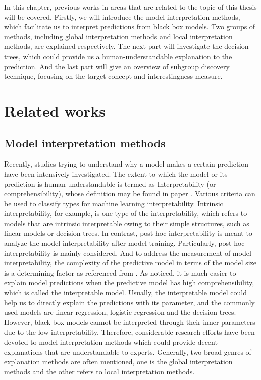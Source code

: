 In this chapter, previous works in areas that are related to the topic of this thesis will be covered. Firstly, we will introduce the model interpretation methods, which facilitate us to interpret predictions from black box models. Two groups of methods, including global interpretation methods and local interpretation methods, are explained respectively. The next part will investigate the decision trees, which could provide us a human-understandable explanation to the prediction. And the last part will give an overview of subgroup discovery technique, focusing on the target concept and interestingness measure. 

\section{Related works}

\subsection{Model interpretation methods}
Recently, studies trying to understand why a model makes a certain prediction have been intensively investigated. The extent to which the model or its prediction is human-understandable is termed as Interpretability (or comprehensibility), whose definition may be found in paper \cite{kim2016examples}. Various criteria can be used to classify types for machine learning interpretability. Intrinsic interpretability, for example, is one type of the interpretability, which refers to models that are intrinsic interpretable owing to their simple structures, such as linear models or decision trees. In contrast, post hoc interpretability is meant to analyze the model interpretability after model training. Particularly, post hoc interpretability is mainly considered. And to address the measurement of model interpretability, the complexity of the predictive model in terms of the model size is a determining factor as referenced from \cite{freitas2014comprehensible}. As noticed, it is much easier to explain model predictions when the predictive model has high comprehensibility, which is called the interpretable model. Usually, the interpretable model could help us to directly explain the predictions with its parameter, and the commonly used models are linear regression, logistic regression and the decision trees. However, black box models cannot be interpreted through their inner parameters due to the low interpretability. Therefore, considerable research efforts have been devoted to model interpretation methods which could provide decent explanations that are understandable to experts. Generally, two broad genres of explanation methods are often mentioned, one is the global interpretation methods and the other refers to local interpretation methods.


